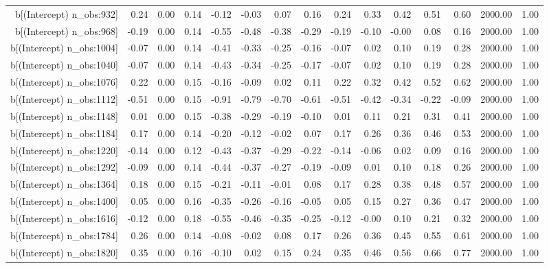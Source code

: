 \begin{table}[ht]
\begin{tabular}{rrrrrrrrrrrrrrr}
  b[(Intercept) n\_obs:932] & 0.24 & 0.00 & 0.14 & -0.12 & -0.03 & 0.07 & 0.16 & 0.24 & 0.33 & 0.42 & 0.51 & 0.60 & 2000.00 & 1.00 \\ 
  b[(Intercept) n\_obs:968] & -0.19 & 0.00 & 0.14 & -0.55 & -0.48 & -0.38 & -0.29 & -0.19 & -0.10 & -0.00 & 0.08 & 0.16 & 2000.00 & 1.00 \\ 
  b[(Intercept) n\_obs:1004] & -0.07 & 0.00 & 0.14 & -0.41 & -0.33 & -0.25 & -0.16 & -0.07 & 0.02 & 0.10 & 0.19 & 0.28 & 2000.00 & 1.00 \\ 
  b[(Intercept) n\_obs:1040] & -0.07 & 0.00 & 0.14 & -0.43 & -0.34 & -0.25 & -0.17 & -0.07 & 0.02 & 0.10 & 0.19 & 0.28 & 2000.00 & 1.00 \\ 
  b[(Intercept) n\_obs:1076] & 0.22 & 0.00 & 0.15 & -0.16 & -0.09 & 0.02 & 0.11 & 0.22 & 0.32 & 0.42 & 0.52 & 0.62 & 2000.00 & 1.00 \\ 
  b[(Intercept) n\_obs:1112] & -0.51 & 0.00 & 0.15 & -0.91 & -0.79 & -0.70 & -0.61 & -0.51 & -0.42 & -0.34 & -0.22 & -0.09 & 2000.00 & 1.00 \\ 
  b[(Intercept) n\_obs:1148] & 0.01 & 0.00 & 0.15 & -0.38 & -0.29 & -0.19 & -0.10 & 0.01 & 0.11 & 0.21 & 0.31 & 0.41 & 2000.00 & 1.00 \\ 
  b[(Intercept) n\_obs:1184] & 0.17 & 0.00 & 0.14 & -0.20 & -0.12 & -0.02 & 0.07 & 0.17 & 0.26 & 0.36 & 0.46 & 0.53 & 2000.00 & 1.00 \\ 
  b[(Intercept) n\_obs:1220] & -0.14 & 0.00 & 0.12 & -0.43 & -0.37 & -0.29 & -0.22 & -0.14 & -0.06 & 0.02 & 0.09 & 0.16 & 2000.00 & 1.00 \\ 
  b[(Intercept) n\_obs:1292] & -0.09 & 0.00 & 0.14 & -0.44 & -0.37 & -0.27 & -0.19 & -0.09 & 0.01 & 0.10 & 0.18 & 0.26 & 2000.00 & 1.00 \\ 
  b[(Intercept) n\_obs:1364] & 0.18 & 0.00 & 0.15 & -0.21 & -0.11 & -0.01 & 0.08 & 0.17 & 0.28 & 0.38 & 0.48 & 0.57 & 2000.00 & 1.00 \\ 
  b[(Intercept) n\_obs:1400] & 0.05 & 0.00 & 0.16 & -0.35 & -0.26 & -0.16 & -0.05 & 0.05 & 0.15 & 0.27 & 0.36 & 0.47 & 2000.00 & 1.00 \\ 
  b[(Intercept) n\_obs:1616] & -0.12 & 0.00 & 0.18 & -0.55 & -0.46 & -0.35 & -0.25 & -0.12 & -0.00 & 0.10 & 0.21 & 0.32 & 2000.00 & 1.00 \\ 
  b[(Intercept) n\_obs:1784] & 0.26 & 0.00 & 0.14 & -0.08 & -0.02 & 0.08 & 0.17 & 0.26 & 0.36 & 0.45 & 0.55 & 0.61 & 2000.00 & 1.00 \\ 
  b[(Intercept) n\_obs:1820] & 0.35 & 0.00 & 0.16 & -0.10 & 0.02 & 0.15 & 0.24 & 0.35 & 0.46 & 0.56 & 0.66 & 0.77 & 2000.00 & 1.00 \\ 

\end{tabular}
\end{table}
